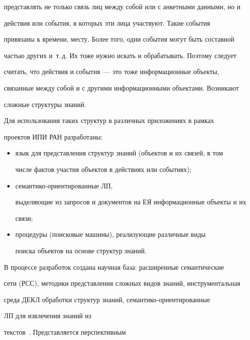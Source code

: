 пред\-став\-лять не только связь лиц между собой или с анкетными данными, но и 


действия или события, в которых эти лица участвуют. Такие события 


привязаны к времени, месту. Более того, одни события могут быть составной 


частью других и~т.\,д. Их тоже нужно искать и обрабатывать. Поэтому следует 


считать, что действия и события~--- это тоже информационные объекты, 


связанные между собой и с другими информационными объектами. Возникают 


сложные структуры знаний. 


    


    Для использования таких структур в различных приложениях в рамках 


проектов ИПИ РАН разработаны:


    \begin{itemize}


    \item язык для представления структур знаний (объектов и их связей, в том 


чис\-ле фактов участия объектов в действиях или событиях);


    \item семантико-ориентированные ЛП, 


выделяющие из запросов и документов на ЕЯ информационные объекты и их 


связи;


    \item процедуры (поисковые машины), реализующие различные виды 


поиска объектов на основе структур знаний.


    \end{itemize}


    


    В процессе разработок создана научная база: расширенные семантические 


сети (РСС), методики представления сложных видов знаний, инструментальная 


среда ДЕКЛ обработки структур знаний, се\-ман\-ти\-ко-ориен\-ти\-ро\-ван\-ные 


ЛП для извлечения знаний из 


    текстов~\cite{7-kuz, 4-kuz, 5-kuz}. Представляется перспективным 


